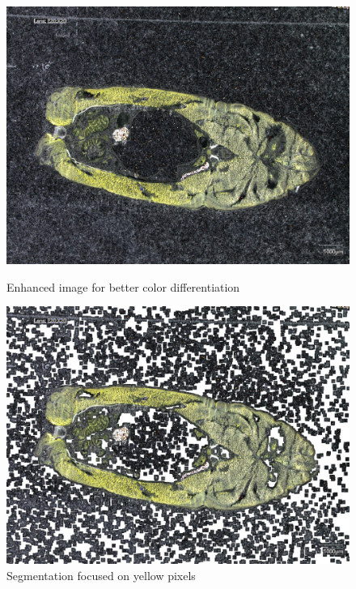 \begin{figure}[H]
    \centering
    \begin{minipage}{0.45\textwidth}
        \centering
        \includegraphics[width=\textwidth]{./fig/threshold/enhanced_image.jpg}
        \caption{Enhanced image for better color differentiation}
        \label{fig:enhanced_image}
    \end{minipage}
    \begin{minipage}{0.45\textwidth}
        \centering
        \includegraphics[width=\textwidth]{./fig/threshold/yellowpic.jpg}
        \caption{Segmentation focused on yellow pixels}
        \label{fig:yellowpic}
    \end{minipage}
\end{figure}

